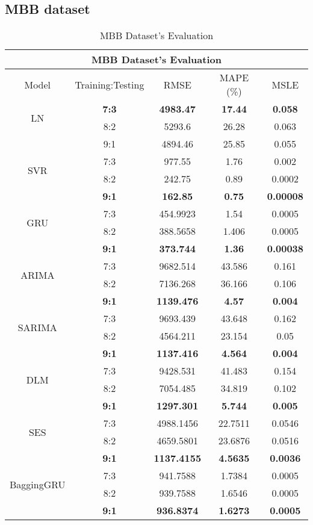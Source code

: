\documentclass{ieeeojies}
\begin{document}
\subsection{MBB dataset} 
\begin{table}[H]
    \centering
    \begin{tabular}{|c|c|c|c|c|}
         \hline
         \multicolumn{5}{|c|}{\textbf{MBB Dataset's Evaluation}}\\
         \hline
         \centering Model & Training:Testing & RMSE & MAPE (\%) & MSLE\\
         \hline
         \multirow{2}{*}{LN} & \textbf{7:3}&\textbf{4983.47}&\textbf{17.44}&\textbf{0.058} \\ & 8:2 &  5293.6 & 26.28 & 0.063 \\ & 9:1&4894.46&25.85&0.055\\
         \hline
         \multirow{2}{*}{SVR} & 7:3&977.55&1.76&0.002 \\ & 8:2&242.75&0.89&0.0002 \\ & \textbf{9:1} & \textbf{162.85} & \textbf{0.75} & \textbf{0.00008}\\
         \hline
         \multirow{2}{*}{GRU} & 7:3&454.9923&1.54&0.0005 \\ &  8:2&388.5658&1.406&	0.0005 \\ & \textbf{9:1} & \textbf{373.744} & \textbf{1.36} & \textbf{0.00038}\\
         \hline
         \multirow{2}{*}{ARIMA} & 7:3 & 9682.514 & 43.586 & 0.161 \\ & 8:2 & 7136.268 & 36.166 & 0.106 \\ & \textbf{9:1} & \textbf{1139.476} & \textbf{4.57} & \textbf{0.004}\\
         \hline
         \multirow{2}{*}{SARIMA} & 7:3 & 9693.439 & 43.648&0.162 \\ &8:2 & 4564.211 & 23.154 & 0.05 \\ &  \textbf{9:1} &  \textbf{1137.416} &  \textbf{4.564} &  \textbf{0.004}\\
         \hline
         \multirow{2}{*}{DLM} & 7:3 & 9428.531 & 41.483 & 0.154 \\ & 8:2 & 7054.485 & 34.819 & 0.102\\ & \textbf{9:1} & \textbf{1297.301} & \textbf{5.744} & \textbf{0.005}\\
         \hline
         \multirow{2}{*}{SES} & 7:3 &  4988.1456 & 22.7511 & 0.0546 \\ & 8:2 & 4659.5801 & 23.6876 & 0.0516 \\ & \textbf{9:1} &  \textbf{1137.4155} &	\textbf{4.5635} & 	\textbf{0.0036} \\
         \hline
         \multirow{2}{*}{BaggingGRU} & 7:3 & 941.7588 &  1.7384 &  0.0005 \\ & 8:2 & 939.7588 &  1.6546 &  0.0005 \\ & \textbf{9:1} & \textbf{936.8374} & \textbf{1.6273} & \textbf{0.0005}\\
         \hline
    \end{tabular}
    \caption{MBB Dataset's Evaluation}
    \label{mbbresult}
\end{table}
\end{document}
